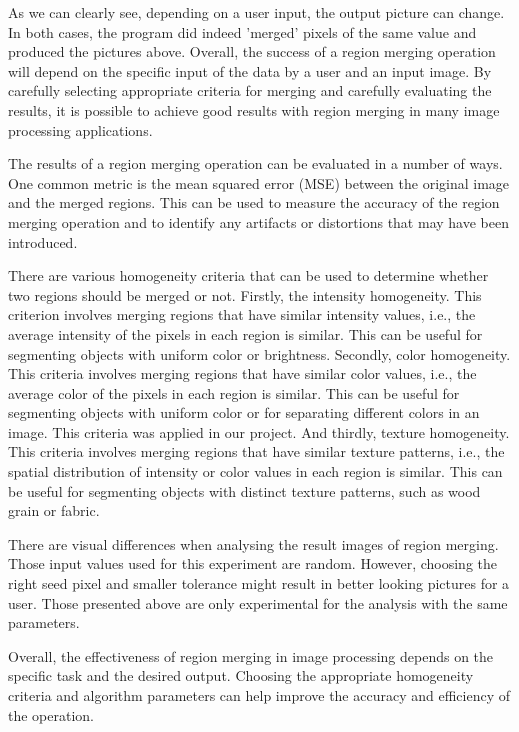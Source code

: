 \documentclass[12pt]{article}
\begin{document}
As we can clearly see, depending on a user input, the output picture can change. In both cases, the program did indeed 'merged' pixels of the same value and produced the pictures above. Overall, the success of a region merging operation will depend on the specific input of the data by a user and an input image. By carefully selecting appropriate criteria for merging and carefully evaluating the results, it is possible to achieve good results with region merging in many image processing applications.

The results of a region merging operation can be evaluated in a number of ways. One common metric is the mean squared error (MSE) between the original image and the merged regions. This can be used to measure the accuracy of the region merging operation and to identify any artifacts or distortions that may have been introduced. 

There are various homogeneity criteria that can be used to determine whether two regions should be merged or not. Firstly, the intensity homogeneity. This criterion involves merging regions that have similar intensity values, i.e., the average intensity of the pixels in each region is similar. This can be useful for segmenting objects with uniform color or brightness. Secondly, color homogeneity. This criteria involves merging regions that have similar color values, i.e., the average color of the pixels in each region is similar. This can be useful for segmenting objects with uniform color or for separating different colors in an image. This criteria was applied in our project. And thirdly, texture homogeneity. This criteria involves merging regions that have similar texture patterns, i.e., the spatial distribution of intensity or color values in each region is similar. This can be useful for segmenting objects with distinct texture patterns, such as wood grain or fabric.

There are visual differences when analysing the result images of region merging. Those input values used for this experiment are random. However, choosing the right seed pixel and smaller tolerance might result in better looking pictures for a user. Those presented above are only experimental for the analysis with the same parameters. 

Overall, the effectiveness of region merging in image processing depends on the specific task and the desired output. Choosing the appropriate homogeneity criteria and algorithm parameters can help improve the accuracy and efficiency of the operation.
\end{document}
